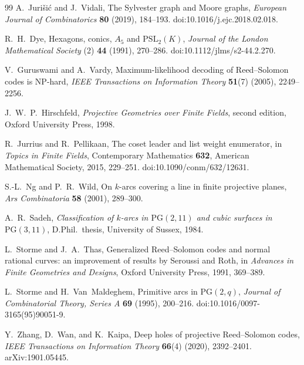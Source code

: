 \documentclass[11pt]{article}
\theoremstyle{definition}
\theoremstyle{remark}
\newcommand{\PG}{\mathrm{PG}}
\begin{document}
\begin{thebibliography}{99}
A.~Juri\v{s}i\'c and J.~Vidali,
\newblock The Sylvester graph and Moore graphs,
\newblock \emph{European Journal of Combinatorics} \textbf{80} (2019),
184--193.
\newblock doi:10.1016/j.ejc.2018.02.018.

R.~H.~Dye,
\newblock Hexagons, conics, $A_5$ and $\mathrm{PSL}_2(K)$,
\newblock \emph{Journal of the London Mathematical Society} (2) \textbf{44}
(1991), 270--286.
\newblock doi:10.1112/jlms/s2-44.2.270.

V.~Guruswami and A.~Vardy,
\newblock Maximum-likelihood decoding of Reed--Solomon codes is NP-hard,
\newblock \emph{IEEE Transactions on Information Theory} \textbf{51}(7)
(2005), 2249--2256.

J.~W.~P.~Hirschfeld,
\newblock \emph{Projective Geometries over Finite Fields}, second edition,
\newblock Oxford University Press, 1998.

R.~Jurrius and R.~Pellikaan,
\newblock The coset leader and list weight enumerator,
\newblock in \emph{Topics in Finite Fields}, Contemporary Mathematics
\textbf{632}, American Mathematical Society, 2015, 229--251.
\newblock doi:10.1090/conm/632/12631.

S.-L.~Ng and P.~R.~Wild,
\newblock On $k$-arcs covering a line in finite projective planes,
\newblock \emph{Ars Combinatoria} \textbf{58} (2001), 289--300.

A.~R.~Sadeh,
\newblock \emph{Classification of $k$-arcs in $\PG(2,11)$ and cubic
surfaces in $\PG(3,11)$},
\newblock D.Phil.\ thesis, University of Sussex, 1984.

L.~Storme and J.~A.~Thas,
\newblock Generalized Reed--Solomon codes and normal rational curves: an
improvement of results by Seroussi and Roth,
\newblock in \emph{Advances in Finite Geometries and Designs}, Oxford
University Press, 1991, 369--389.

L.~Storme and H.~Van~Maldeghem,
\newblock Primitive arcs in $\PG(2,q)$,
\newblock \emph{Journal of Combinatorial Theory, Series A} \textbf{69}
(1995), 200--216.
\newblock doi:10.1016/0097-3165(95)90051-9.

Y.~Zhang, D.~Wan, and K.~Kaipa,
\newblock Deep holes of projective Reed--Solomon codes,
\newblock \emph{IEEE Transactions on Information Theory} \textbf{66}(4)
(2020), 2392--2401.
\newblock arXiv:1901.05445.

\end{thebibliography}
\end{document}
